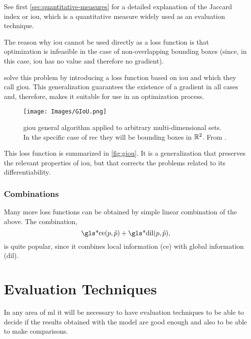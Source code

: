 See first \vref{sec:quantitative-measures} for a detailed explanation of the
Jaccard index or \gls{iou}, which is a quantitative measure widely used as an
evaluation technique.

\begin{remarkBox}
  The reason why \gls{iou} cannot be used directly as a loss function is that
  optimization is infeasible in the case of non-overlapping bounding boxes
  (since, in this case, \gls{iou} has no value and therefore no gradient).
\end{remarkBox}

 solve this problem by introducing a loss function
based on \gls{iou} and which they call \gls{giou}. This generalization
guarantees the existence of a gradient in all cases and, therefore, makes it
suitable for use in an optimization process.

\begin{figure}[ht]
  \centering
  \texttt{[image: Images/GIoU.png]}
  \caption[\acl*{giou} algorithm]{\acf{giou} general algorithm applied to
    arbitrary multi-dimensional sets. In the specific case of \gls{rec} they
    will be bounding boxes in \(\mathbb{R}^2\). From
    .}\label{fig:giou}
\end{figure}

This loss function is summarized in \vref{fig:giou}. It is a generalization
that preserves the relevant properties of \gls{iou}, but that corrects the
problems related to its differentiability.

\subsubsection{Combinations}

Many more loss functions can be obtained by simple linear combination of the
above. The combination,
\begin{equation}
  \text{\gls*{ce}}(p, \hat{p}) + \text{\gls*{dil}}(p, \hat{p}),
\end{equation}
is quite popular, since it combines local information (\gls{ce}) with global
information (\gls{dil}).



\section{Evaluation Techniques}\label{sec:eval-measure}

In any area of \gls{ml} it will be necessary to have evaluation techniques to
be able to decide if the results obtained with the model are good enough and
also to be able to make comparisons.

